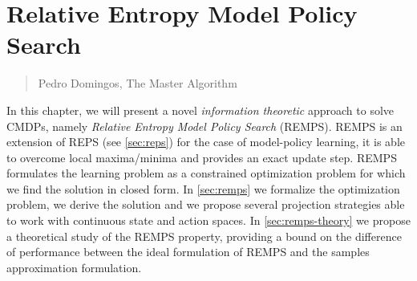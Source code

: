 \chapter{Relative Entropy Model Policy Search}
\label{chapter4}
\thispagestyle{empty}

\begin{quotation}
{\footnotesize
{}
\begin{flushright}
Pedro Domingos, The Master Algorithm
\end{flushright}
}
\end{quotation}
\vspace{0.5cm}

In this chapter, we will present a novel \textit{information theoretic} approach to solve CMDPs, namely \textit{Relative Entropy Model Policy Search} (REMPS). REMPS is an extension of REPS (see \cref{sec:reps}) for the case of model-policy learning, it is able to overcome local maxima/minima and provides an exact update step. REMPS formulates the learning problem as a constrained optimization problem for which we find the solution in closed form. \newline
In \cref{sec:remps} we formalize the optimization problem, we derive the solution and we propose several projection strategies able to work with continuous state and action spaces. In \cref{sec:remps-theory} we propose a theoretical study of the REMPS property, providing a bound on the difference of performance between the ideal formulation of REMPS and the samples approximation formulation.

